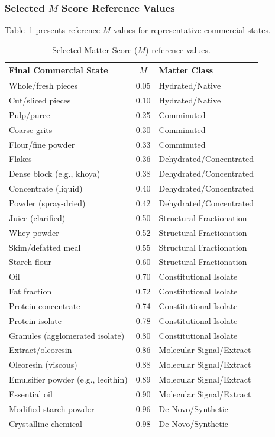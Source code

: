 \documentclass[12pt,a3paper]{article}
\begin{document}
\subsubsection{Selected $M$ Score Reference Values}

Table~\ref{tab:mscores} presents reference $M$ values for representative commercial states.

\begin{table}[htbp]
\centering
\caption{Selected Matter Score ($M$) reference values.}
\label{tab:mscores}
\renewcommand{\arraystretch}{1.2}
\begin{tabular}{lcl}
\toprule
\textbf{Final Commercial State} & \textbf{$M$} & \textbf{Matter Class} \\
\midrule
Whole/fresh pieces & 0.05 & Hydrated/Native \\
Cut/sliced pieces & 0.10 & Hydrated/Native \\
Pulp/puree & 0.25 & Comminuted \\
Coarse grits & 0.30 & Comminuted \\
Flour/fine powder & 0.33 & Comminuted \\
Flakes & 0.36 & Dehydrated/Concentrated \\
Dense block (e.g., khoya) & 0.38 & Dehydrated/Concentrated \\
Concentrate (liquid) & 0.40 & Dehydrated/Concentrated \\
Powder (spray-dried) & 0.42 & Dehydrated/Concentrated \\
Juice (clarified) & 0.50 & Structural Fractionation \\
Whey powder & 0.52 & Structural Fractionation \\
Skim/defatted meal & 0.55 & Structural Fractionation \\
Starch flour & 0.60 & Structural Fractionation \\
Oil & 0.70 & Constitutional Isolate \\
Fat fraction & 0.72 & Constitutional Isolate \\
Protein concentrate & 0.74 & Constitutional Isolate \\
Protein isolate & 0.78 & Constitutional Isolate \\
Granules (agglomerated isolate) & 0.80 & Constitutional Isolate \\
Extract/oleoresin & 0.86 & Molecular Signal/Extract \\
Oleoresin (viscous) & 0.88 & Molecular Signal/Extract \\
Emulsifier powder (e.g., lecithin) & 0.89 & Molecular Signal/Extract \\
Essential oil & 0.90 & Molecular Signal/Extract \\
Modified starch powder & 0.96 & De Novo/Synthetic \\
Crystalline chemical & 0.98 & De Novo/Synthetic \\
\bottomrule
\end{tabular}
\end{table}
\end{document}
